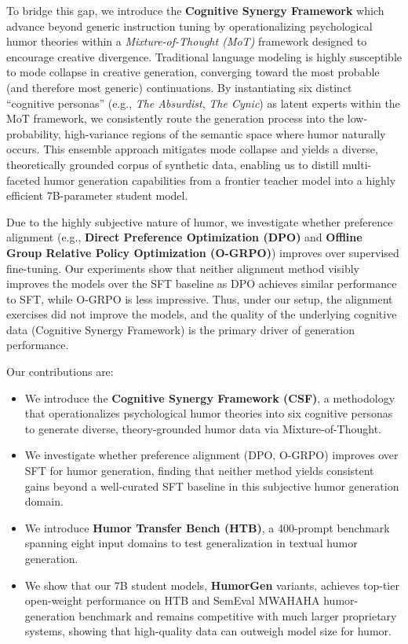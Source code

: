 \documentclass[11pt]{article}
\begin{document}
To bridge this gap, we introduce the \textbf{Cognitive Synergy Framework} which advance beyond generic instruction tuning by operationalizing psychological humor theories within a \textit{Mixture-of-Thought (MoT)} framework designed to encourage creative divergence. Traditional language modeling is highly susceptible to mode collapse in creative generation, converging toward the most probable (and therefore most generic) continuations. By instantiating six distinct ``cognitive personas'' (e.g., \textit{The Absurdist}, \textit{The Cynic}) as latent experts within the MoT framework, we consistently route the generation process into the low-probability, high-variance regions of the semantic space where humor naturally occurs. This ensemble approach mitigates mode collapse and yields a diverse, theoretically grounded corpus of synthetic data, enabling us to distill multi-faceted humor generation capabilities from a frontier teacher model into a highly efficient 7B-parameter student model.

Due to the highly subjective nature of humor, we investigate whether preference alignment (e.g., \textbf{Direct Preference Optimization (DPO)} and \textbf{Offline Group Relative Policy Optimization (O-GRPO)}) improves over supervised fine-tuning. Our experiments show that neither alignment method visibly improves the models over the SFT baseline as DPO achieves similar performance to SFT, while O-GRPO is less impressive. Thus, under our setup, the alignment exercises did not improve the models, and the quality of the underlying cognitive data (Cognitive Synergy Framework) is the primary driver of generation performance.

Our contributions are:
\begin{itemize}
    \item We introduce the \textbf{Cognitive Synergy Framework (CSF)}, a methodology that operationalizes psychological humor theories into six cognitive personas to generate diverse, theory-grounded humor data via Mixture-of-Thought.
    \item We investigate whether preference alignment (DPO, O-GRPO) improves over SFT for humor generation, finding that neither method yields consistent gains beyond a well-curated SFT baseline in this subjective humor generation domain.
    \item We introduce \textbf{Humor Transfer Bench (HTB)}, a 400-prompt benchmark spanning eight input domains to test generalization in textual humor generation.
    \item We show that our 7B student models, \textbf{HumorGen} variants, achieves top-tier open-weight performance on HTB and SemEval MWAHAHA humor-generation benchmark and remains competitive with much larger proprietary systems, showing that high-quality data can outweigh model size for humor.
\end{itemize}
\end{document}
